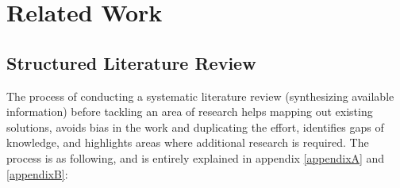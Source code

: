\section{Related Work} 

\subsection{Structured Literature Review}

The process of conducting a systematic literature review (synthesizing available information) before tackling an area of research helps mapping out existing solutions, avoids bias in the work and duplicating the effort, identifies gaps of knowledge, and highlights areas where additional research is required\citep{kofod2014}. The process is as following, and is entirely explained in appendix \ref{appendixA} and \ref{appendixB}:
